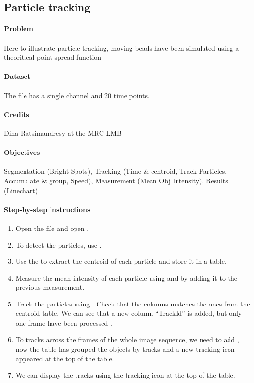\subsection{Particle tracking}

\paragraph{Problem}
Here to illustrate particle tracking, moving beads have been simulated using a theoritical point spread function.

\paragraph{Dataset} The file  has a single channel and 20 time points.

\paragraph{Credits} Dina Ratsimandresy at the MRC-LMB

\paragraph{Objectives} Segmentation (Bright Spots), Tracking (Time \& centroid, Track Particles, Accumulate \& group, Speed), Measurement (Mean Obj Intensity), Results (Linechart)


\paragraph{Step-by-step instructions}

\begin{enumerate}
    \item Open the file  and open .
    \item To detect the particles, use 
    . 
    \item Use the  to extract the centroid of each particle and store it in a table.
    \item Measure the mean intensity of each particle using  and by adding it to the previous measurement.
    \item Track the particles using . Check that the columns matches the ones from the centroid table. We can see that a new column ``TrackId'' is added, but only one frame have been processed
    .
    \item To tracks across the frames of the whole image sequence, we need to add , now the table has grouped the objects by tracks and a new tracking icon appeared at the top of the table.  
    \item We can display the tracks using the tracking icon at the top of the table.
\end{enumerate}


